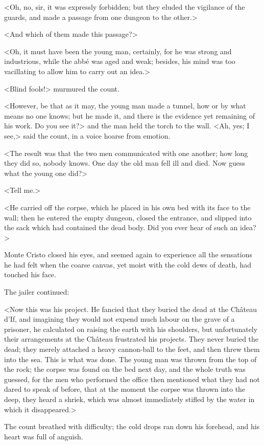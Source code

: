  <Oh, no, sir, it was expressly forbidden; but they eluded the vigilance of the guards, and made a passage from one dungeon to the other.> 

 <And which of them made this passage?> 

 <Oh, it must have been the young man, certainly, for he was strong and industrious, while the abbé was aged and weak; besides, his mind was too vacillating to allow him to carry out an idea.> 

 <Blind fools!> murmured the count. 

 <However, be that as it may, the young man made a tunnel, how or by what means no one knows; but he made it, and there is the evidence yet remaining of his work. Do you see it?> and the man held the torch to the wall.  <Ah, yes; I see,> said the count, in a voice hoarse from emotion. 

 <The result was that the two men communicated with one another; how long they did so, nobody knows. One day the old man fell ill and died. Now guess what the young one did?> 

 <Tell me.> 

 <He carried off the corpse, which he placed in his own bed with its face to the wall; then he entered the empty dungeon, closed the entrance, and slipped into the sack which had contained the dead body. Did you ever hear of such an idea?> 

 Monte Cristo closed his eyes, and seemed again to experience all the sensations he had felt when the coarse canvas, yet moist with the cold dews of death, had touched his face. 

 The jailer continued: 

 <Now this was his project. He fancied that they buried the dead at the Château d'If, and imagining they would not expend much labour on the grave of a prisoner, he calculated on raising the earth with his shoulders, but unfortunately their arrangements at the Château frustrated his projects. They never buried the dead; they merely attached a heavy cannon-ball to the feet, and then threw them into the sea. This is what was done. The young man was thrown from the top of the rock; the corpse was found on the bed next day, and the whole truth was guessed, for the men who performed the office then mentioned what they had not dared to speak of before, that at the moment the corpse was thrown into the deep, they heard a shriek, which was almost immediately stifled by the water in which it disappeared.> 

 The count breathed with difficulty; the cold drops ran down his forehead, and his heart was full of anguish. 

